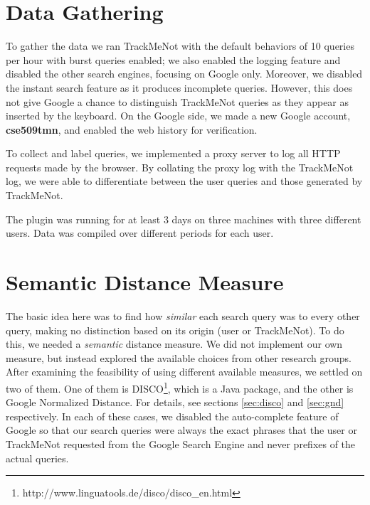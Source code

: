 \documentclass{llncs}
\begin{document}
\begin{multicols}{2}
\section{Data Gathering}
To gather the data we ran TrackMeNot with the default behaviors of 10
queries per hour with burst queries enabled; we also enabled the
logging feature and disabled the other search engines, focusing on
Google only. Moreover, we disabled the instant search feature as it
produces incomplete queries. However, this does not give Google a
chance to distinguish TrackMeNot queries as they appear as inserted by
the keyboard. On the Google side, we made a new Google account,
\textbf{cse509tmn}, and enabled the web history for verification.

To collect and label queries, we implemented a proxy server to log all
HTTP requests made by the browser. By collating the proxy log
with the TrackMeNot log, we were able to differentiate between the
user queries and those generated by TrackMeNot.

The plugin was running for at least 3 days on three machines with
three different users. Data was compiled over different periods for
each user.

\section{Semantic Distance Measure}
The basic idea here was to find how \textit{similar} each search query
was to every other query, making no distinction based on its origin
(user or TrackMeNot). To do this, we needed a \textit{semantic}
distance measure. We did not implement our own measure, but instead
explored the available choices from other research groups. After
examining the feasibility of using different available measures, we
settled on two of them. One of them is
DISCO\footnote{http://www.linguatools.de/disco/disco\_en.html}, which
is a Java package, and the other is Google Normalized Distance. For
details, see sections \ref{sec:disco} and \ref{sec:gnd}
respectively. In each of these cases, we disabled the auto-complete
feature of Google so that our search queries were always the exact
phrases that the user or TrackMeNot requested from the Google Search
Engine and never prefixes of the actual queries.


\end{multicols}
\end{document}
